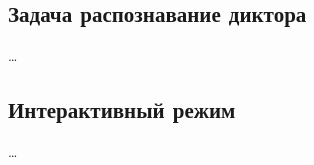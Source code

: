 \subsection{Задача распознавание диктора}
    \ldots

\subsection{Интерактивный режим}\label{ssec:isr}
    \ldots